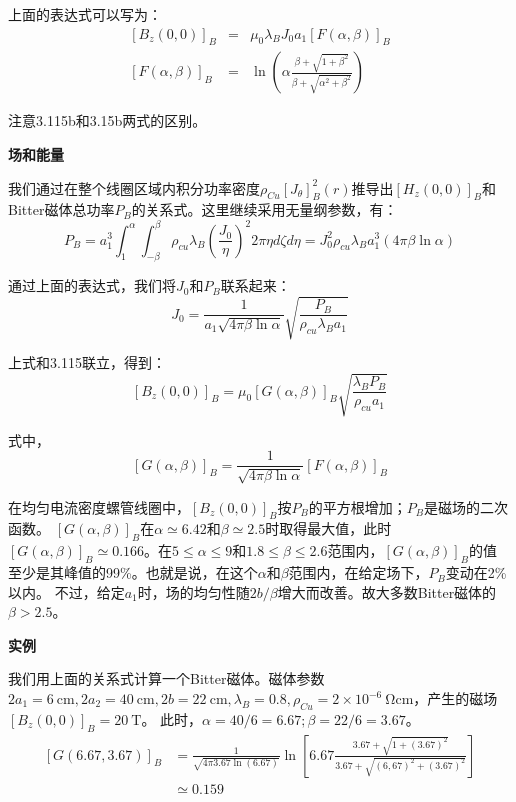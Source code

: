 上面的表达式可以写为：
\begin{eqnarray}
{[B_z(0,0)]}_B&=&\mu_0\lambda_B J_0a_1[F(\alpha,\beta)]_B\\ %
{[F(\alpha,\beta)]}_B&=&\ln\left(\alpha\frac{\beta+\sqrt{1+\beta^2}}{\beta+\sqrt{\alpha^2+\beta^2}}\right)%
\end{eqnarray}

注意3.115b和3.15b两式的区别。

\textbf{场和能量}

我们通过在整个线圈区域内积分功率密度$\rho_{Cu} [J_\theta]_B^2(r)$推导出$[H_z(0,0)]_B$和Bitter磁体总功率$P_B$的关系式。这里继续采用无量纲参数，有：
\begin{equation}
P_B=a_1^3\int_{1}^{\alpha}\int_{-\beta}^{\beta}\rho_{cu}\lambda_B(\frac{J_0}{\eta})^2 2\pi\eta d\zeta d\eta=J_0^2\rho_{cu}\lambda_B a_1^3(4\pi\beta\ln\alpha)%
\end{equation}

通过上面的表达式，我们将$J_0$和$P_B$联系起来：
\begin{equation}
J_0=\frac{1}{a_1\sqrt{4\pi\beta\ln\alpha}}\sqrt{\frac{P_B}{\rho_{cu}\lambda_B a_1}}%
\end{equation}

上式和3.115联立，得到：
\begin{equation}
{[B_z(0,0)]}_B=\mu_0[G(\alpha,\beta)]_B\sqrt{\frac{\lambda_B P_B}{\rho_{cu}a_1}}%
\end{equation}

式中，
\begin{equation}
{[G(\alpha,\beta)]}_B=\frac{1}{\sqrt{4\pi\beta\ln\alpha}}[F(\alpha,\beta)]_B%
\end{equation}

在均匀电流密度螺管线圈中，$[B_z(0,0)]_B$按$P_B$的平方根增加；$P_B$是磁场的二次函数。
$[G(\alpha,\beta)]_B$在$\alpha\simeq 6.42$和$\beta\simeq 2.5$时取得最大值，此时$[G(\alpha,\beta)]_B\simeq 0.166$。在$5\leq \alpha \leq 9$和$1.8\leq\beta\leq 2.6$范围内，$[G(\alpha,\beta)]_B$的值
至少是其峰值的99\%。也就是说，在这个$\alpha$和$\beta$范围内，在给定场下，$P_B$变动在2\%以内。
不过，给定$a_1$时，场的均匀性随$2b/\beta$增大而改善。故大多数Bitter磁体的$\beta>2.5$。

\textbf{实例}

我们用上面的关系式计算一个Bitter磁体。磁体参数$2a_1=6\ \mathrm{cm}, 2a_2=40\ \mathrm{cm}, 2b=22 \ \mathrm{cm},\lambda_B=0.8, \rho_{Cu}=2\times10^{-6}\ \mathrm{\Omega cm}$，产生的磁场$[B_z(0,0)]_B=20\ \mathrm{T}$。
此时，$\alpha=40/6=6.67;\beta=22/6=3.67$。
\begin{equation}
\begin{split}
{[G(6.67,3.67)]}_B&=\frac{1}{\sqrt{4\pi3.67\ln(6.67)}}\ln\left[6.67\frac{3.67+\sqrt{1+(3.67)^2}}{3.67+\sqrt{(6,67)^2+(3.67)^2}}\right]\\
&\simeq 0.159 %
\end{split}
\end{equation}

